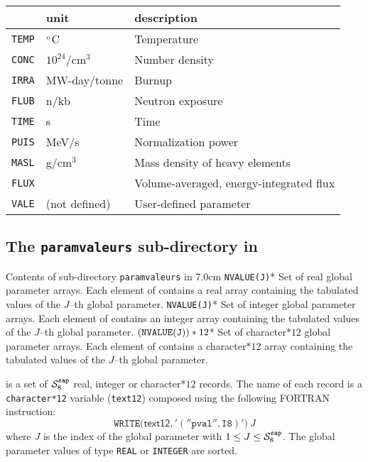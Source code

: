\noindent\begin{tabular}{ p{1cm} p{3cm} p{7cm} }
\hline
 & unit & description \\
\hline
{\tt TEMP} & $^{\rm o}$C & Temperature \\
{\tt CONC} & $10^{24}$/cm$^3$ & Number density \\
{\tt IRRA} & MW-day/tonne & Burnup \\
{\tt FLUB} & n/kb & Neutron exposure \\
{\tt TIME} & s & Time \\
{\tt PUIS} & MeV/s & Normalization power \\
{\tt MASL} & g/cm$^3$ & Mass density of heavy elements \\
{\tt FLUX} &  & Volume-averaged, energy-integrated flux \\
{\tt VALE} & (not defined) & User-defined parameter \\
\hline
\end{tabular}

\subsection{The {\tt paramvaleurs} sub-directory in }\label{sect:sapdirparval}

\vskip -0.5cm

\begin{DescriptionEnregistrement}{Contents of sub-directory {\tt paramvaleurs} in }{7.0cm}
\OptRealVar
  {}{\tt NVALUE(J)}{*}{}
  {Set of real global parameter arrays. Each element of  contains a
   real array containing the tabulated values of the $J$--th global parameter.}
\OptIntVar
  {}{\tt NVALUE(J)}{*}
  {Set of integer global parameter arrays.  Each element of  contains an
   integer array containing the tabulated values of the $J$--th global parameter.}
\OptCharVar
  {}{$({\tt NVALUE(J)})*12$}{*}
  {Set of character$*12$ global parameter arrays. Each element of  contains a
   character$*12$ array containing the tabulated values of the $J$--th global parameter.}
\end{DescriptionEnregistrement}

 is a set of $\mathcal{S}^{\tt sap}_8$ real,
integer or character*$12$ records. The name of each
 record is a {\tt character*12} variable ({\tt text12})
composed using the following FORTRAN instruction:
$$
\mathtt{WRITE(}\mathsf{text12}\mathtt{,'(''pval'',I8)')}\: J
$$
where $J$ is the index of the global parameter with $1 \leq J \leq \mathcal{S}^{\tt sap}_8$. The global
parameter values of type {\tt REAL} or {\tt INTEGER} are sorted.

